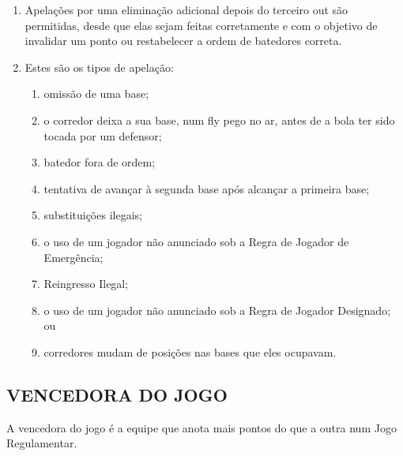 \begin{multicols}{2}
\begin{enumerate}[label=\alph*)]
	\begin{enumerate}[label=\roman* -]
		\item Se a bola fica fora de jogo, a apela\c{c}\~ao com bola morta n\~ao pode ser feita at\'e que o \'arbitro de \gls{home} coloque uma nova bola no jogo. 
		\item Se o arremessador, de posse da bola, est\'a em contato com o \gls{pitcher's plate} quando faz uma apela\c{c}\~ao verbal, n\~ao deve ser declarado um Arremesso Ilegal. 
		\item Se o arremessador faz uma apela\c{c}\~ao depois da ordem \gls{play ball}, o \'arbitro deve declarar \gls{time} outra vez e permitir o processo de apela\c{c}\~ao. 
	\end{enumerate}
	\item  Apela\c{c}\~oes por uma elimina\c{c}\~ao adicional depois do terceiro \gls{out} s\~ao permitidas, desde que elas sejam feitas corretamente e com o objetivo de invalidar um ponto ou restabelecer a ordem de batedores correta. 

	\item  Estes s\~ao os tipos de apela\c{c}\~ao: 
	\begin{enumerate}[label=\roman* -]
		\item omiss\~ao de uma base; 
		\item o corredor deixa a sua base, num \gls{fly} pego no ar, antes de a bola ter sido tocada por um defensor; 
		\item batedor fora de ordem; 
		\item tentativa de avan\c{c}ar \`a segunda base após alcan\c{c}ar a primeira base; 
		\item substitui\c{c}\~oes ilegais; 
		\item o uso de um jogador n\~ao anunciado sob a Regra de Jogador de Emerg\^encia; 
		\item Reingresso Ilegal; 
		\item o uso de um jogador n\~ao anunciado sob a Regra de Jogador Designado; ou 
		\item corredores mudam de posi\c{c}\~oes nas bases que eles ocupavam. 
	\end{enumerate}
\end{enumerate}

\subsection{VENCEDORA DO JOGO}
A vencedora do jogo \'e a equipe que anota mais pontos do que a outra num Jogo Regulamentar. 


\end{multicols}
